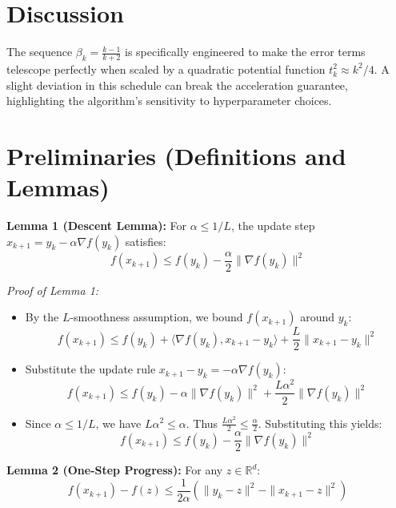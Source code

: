 \documentclass[11pt]{article}
\begin{document}
\section*{Discussion}
The sequence $\beta_k = \frac{k-1}{k+2}$ is specifically engineered to make the error terms telescope perfectly when scaled by a quadratic potential function $t_k^2 \approx k^2/4$. A slight deviation in this schedule can break the acceleration guarantee, highlighting the algorithm's sensitivity to hyperparameter choices.

\section*{Preliminaries (Definitions and Lemmas)}

\textbf{Lemma 1 (Descent Lemma):} For $\alpha \le 1/L$, the update step $x_{k+1} = y_k - \alpha \nabla f(y_k)$ satisfies:
$$f(x_{k+1}) \le f(y_k) - \frac{\alpha}{2} \|\nabla f(y_k)\|^2$$

\textit{Proof of Lemma 1:}
\begin{itemize}
    \item[{[Step 1]}] By the $L$-smoothness assumption, we bound $f(x_{k+1})$ around $y_k$:
    $$f(x_{k+1}) \le f(y_k) + \langle \nabla f(y_k), x_{k+1} - y_k \rangle + \frac{L}{2} \|x_{k+1} - y_k\|^2$$
    \item[{[Step 2]}] Substitute the update rule $x_{k+1} - y_k = -\alpha \nabla f(y_k)$:
    $$f(x_{k+1}) \le f(y_k) - \alpha \|\nabla f(y_k)\|^2 + \frac{L\alpha^2}{2} \|\nabla f(y_k)\|^2$$
    \item[{[Step 3]}] Since $\alpha \le 1/L$, we have $L\alpha^2 \le \alpha$. Thus $\frac{L\alpha^2}{2} \le \frac{\alpha}{2}$. Substituting this yields:
    $$f(x_{k+1}) \le f(y_k) - \frac{\alpha}{2} \|\nabla f(y_k)\|^2$$
\end{itemize}

\textbf{Lemma 2 (One-Step Progress):} For any $z \in \mathbb{R}^d$:
$$f(x_{k+1}) - f(z) \le \frac{1}{2\alpha} \left( \|y_k - z\|^2 - \|x_{k+1} - z\|^2 \right)$$
\end{document}
